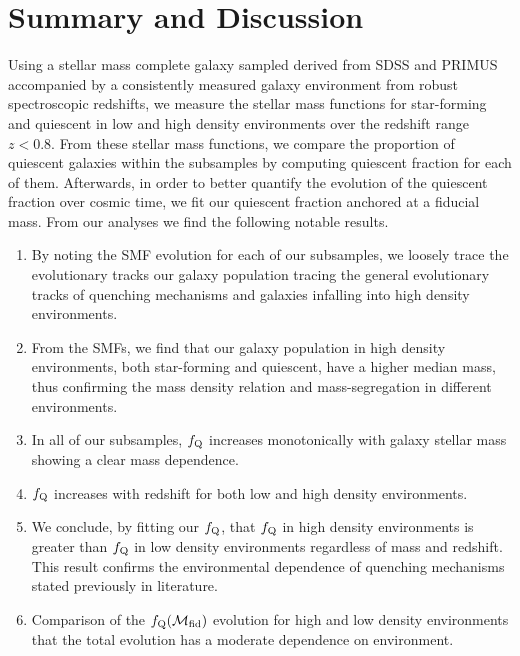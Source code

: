 \documentclass{emulateapj}
\begin{document}
\section{Summary and Discussion} \label{sec:summary}
Using a stellar mass complete galaxy sampled derived from SDSS and PRIMUS accompanied by a consistently measured galaxy environment from robust spectroscopic redshifts, we measure the stellar mass functions for star-forming and quiescent in low and high density environments over the redshift range $z < 0.8$. From these stellar mass functions, we compare the proportion of quiescent galaxies within the subsamples by computing quiescent fraction for each of them. Afterwards, in order to better quantify the evolution of the quiescent fraction over cosmic time, we fit our quiescent fraction anchored at a fiducial mass. From our analyses we find the following notable results. 

\begin{enumerate}
	\item By noting the SMF evolution for each of our subsamples, we loosely trace the evolutionary tracks our galaxy population tracing the general evolutionary tracks of quenching mechanisms and galaxies infalling into high density environments. 
	\item From the SMFs, we find that our galaxy population in high density environments, both star-forming and quiescent, have a higher median mass, thus confirming the mass density relation and mass-segregation in different environments.
	\item In all of our subsamples, $f_{\rm{Q}}$ increases monotonically with galaxy stellar mass showing a clear mass dependence. 
	\item $f_{\rm{Q}}$ increases with redshift for both low and high density environments.
	\item We conclude, by fitting our $f_{\rm{Q}}$, that $f_{\rm{Q}}$ in high density environments is greater than $f_{\rm{Q}}$ in low density environments regardless of mass and redshift. This result confirms the environmental dependence of quenching mechanisms stated previously in literature. 
	\item Comparison of the $f_{\rm{Q}}(\mathcal{M}_{\rm{fid}})$ evolution for high and low density environments that the total evolution has a moderate dependence on environment. 
\end{enumerate}

\end{document}
